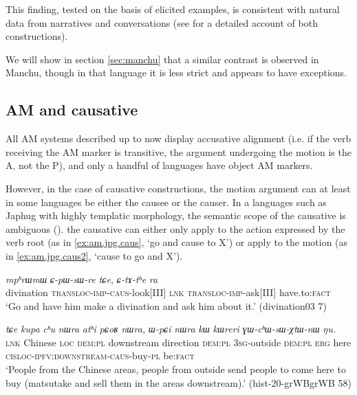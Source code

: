 \documentclass{article}
\newcommand{\ipa}[1]{\textit{{\phon\mbox{#1}}}} %
\begin{document}
This finding, tested on the basis of elicited examples, is consistent with natural data from narratives and conversations (see \citealt{jacques13harmonization} for a detailed account of both constructions).
  
We will show in section \ref{sec:manchu} that a similar contrast is observed in Manchu, though in that language it is less strict and appears to have exceptions.

  
\subsection{AM and causative} \label{sec:japhug.am.caus}
All AM systems described up to now display accusative alignment (i.e. if the verb receiving the AM marker is transitive, the argument undergoing the motion is the A, not the P), and only a handful of languages have object AM markers. 

However, in the case of causative constructions, the motion argument can at least in some languages be either the causee or the causer. In a languages such as Japhug with highly templatic morphology, the semantic scope of the causative is ambiguous (\citealt[182]{jacques15causative}). the causative can either only apply to the action expressed by the verb root (as in  \ref{ex:am.jpg.caus}, `go and cause to X')  or apply to the motion (as in \ref{ex:am.jpg.caus2}, `cause to go and X').


  \begin{exe}
\ex \label{ex:am.jpg.caus}
\gll
\ipa{mpʰrɯmɯ} 	\ipa{ɕ-pɯ-sɯ-re} 	\ipa{tɕe,} 	\ipa{ɕ-tɤ-tʰe} 	\ipa{ra} \\
divination \textsc{transloc-imp-caus}-look[III] \textsc{lnk} \textsc{transloc-imp}-ask[III] have.to:\textsc{fact} \\
\glt  `Go and have him make a divination and ask him about it.' (divination03 7)
  \end{exe} 

  \begin{exe}
\ex \label{ex:am.jpg.caus2}
\gll
\ipa{tɕe} 	\ipa{kupa} 	\ipa{cʰu} 	\ipa{nɯra} 	\ipa{atʰi} 	\ipa{pɕoʁ} 	\ipa{nɯra,} 	\ipa{ɯ-pɕi} 	\ipa{nɯra} 	\ipa{kɯ} 	\ipa{kɯreri} 	\ipa{ɣɯ-cʰɯ-sɯ-χtɯ-nɯ} 	\ipa{ŋu.}  \\
\textsc{lnk} Chinese \textsc{loc} \textsc{dem:pl} downstream direction \textsc{dem:pl} \textsc{3sg}-outside  \textsc{dem:pl}  \textsc{erg} here \textsc{cisloc-ipfv:downstream-caus}-buy-\textsc{pl} be\textsc{:fact} \\
\glt `People from the Chinese areas, people from outside send people to come here to buy (matsutake and sell them in the areas downstream).' (hist-20-grWBgrWB 58)
  \end{exe} 
  
\end{document}
